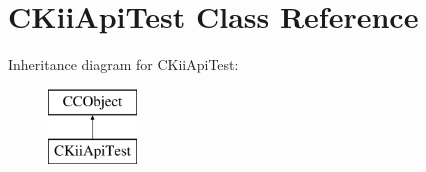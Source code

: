 \hypertarget{class_c_kii_api_test}{\section{C\-Kii\-Api\-Test Class Reference}
\label{class_c_kii_api_test}
}
Inheritance diagram for C\-Kii\-Api\-Test\-:\begin{figure}[H]
\begin{center}
\leavevmode
\includegraphics[height=2.000000cm]{class_c_kii_api_test}
\end{center}
\end{figure}
